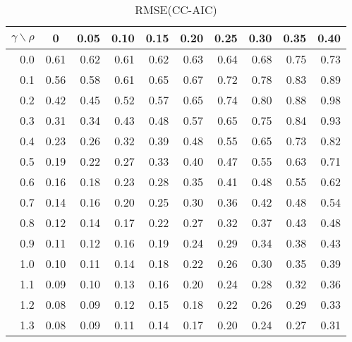 \documentclass[12pt]{article}
\begin{document}
\begin{table}[!tbp]
\caption{RMSE(CC-AIC)}
 \begin{center}
 \begin{tabular}{r|rrrrrrrrr}\hline\hline
\multicolumn{1}{c|}{$\gamma\backslash\rho$}&\multicolumn{1}{c}{0}&\multicolumn{1}{c}{0.05}&\multicolumn{1}{c}{0.10}&\multicolumn{1}{c}{0.15}&\multicolumn{1}{c}{0.20}&\multicolumn{1}{c}{0.25}&\multicolumn{1}{c}{0.30}&\multicolumn{1}{c}{0.35}&\multicolumn{1}{c}{0.40}\tabularnewline
\hline


0.0&0.61&0.62&0.61&0.62&0.63&0.64&0.68&0.75&0.73\tabularnewline
0.1&0.56&0.58&0.61&0.65&0.67&0.72&0.78&0.83&0.89\tabularnewline
0.2&0.42&0.45&0.52&0.57&0.65&0.74&0.80&0.88&0.98\tabularnewline
0.3&0.31&0.34&0.43&0.48&0.57&0.65&0.75&0.84&0.93\tabularnewline
0.4&0.23&0.26&0.32&0.39&0.48&0.55&0.65&0.73&0.82\tabularnewline
0.5&0.19&0.22&0.27&0.33&0.40&0.47&0.55&0.63&0.71\tabularnewline
0.6&0.16&0.18&0.23&0.28&0.35&0.41&0.48&0.55&0.62\tabularnewline
0.7&0.14&0.16&0.20&0.25&0.30&0.36&0.42&0.48&0.54\tabularnewline
0.8&0.12&0.14&0.17&0.22&0.27&0.32&0.37&0.43&0.48\tabularnewline
0.9&0.11&0.12&0.16&0.19&0.24&0.29&0.34&0.38&0.43\tabularnewline
1.0&0.10&0.11&0.14&0.18&0.22&0.26&0.30&0.35&0.39\tabularnewline
1.1&0.09&0.10&0.13&0.16&0.20&0.24&0.28&0.32&0.36\tabularnewline
1.2&0.08&0.09&0.12&0.15&0.18&0.22&0.26&0.29&0.33\tabularnewline
1.3&0.08&0.09&0.11&0.14&0.17&0.20&0.24&0.27&0.31\tabularnewline
\hline
\end{tabular}

\end{center}

\end{table}

%
\end{document}
